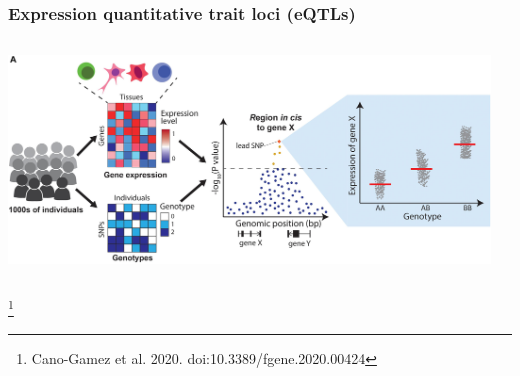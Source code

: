 \documentclass{beamer}
\newcommand\blfootnote[1]{%
    \begingroup
    \renewcommand\thefootnote{}\footnote{#1}%
    \addtocounter{footnote}{-1}%
    \endgroup
}
\begin{document}
    \begin{frame}
        \frametitle{Expression quantitative trait loci (eQTLs)}

        \begin{columns}
            \begin{column}{0.5\textwidth}
                \begin{center}
                    \includegraphics[width=\textwidth]{../presentation_230120_gold2022_paris/fig/doi_10.3389_fgene.2020.00424_fig4a.jpg}
                \end{center}
            \end{column}
            \begin{column}{0.5\textwidth}

            \end{column}
        \end{columns}

        \blfootnote{Cano-Gamez et al. 2020. doi:10.3389/fgene.2020.00424}
    \end{frame}
\end{document}
